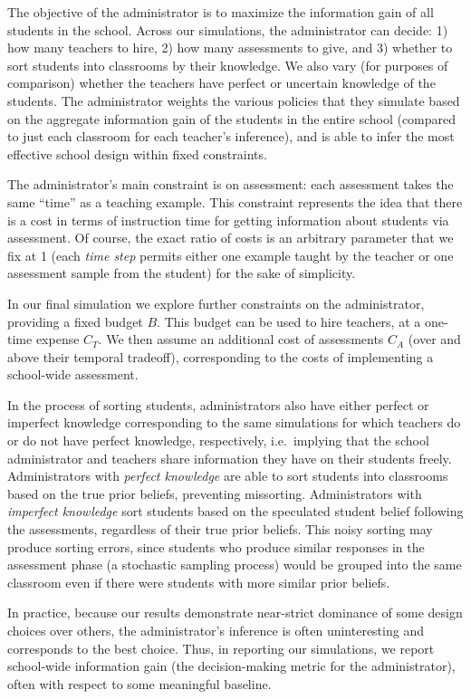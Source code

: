 \documentclass[10pt, letterpaper]{article}
\begin{document}
The objective of the administrator is to maximize the information gain
of all students in the school. Across our simulations, the administrator
can decide: 1) how many teachers to hire, 2) how many assessments to
give, and 3) whether to sort students into classrooms by their
knowledge. We also vary (for purposes of comparison) whether the
teachers have perfect or uncertain knowledge of the students. The
administrator weights the various policies that they simulate based on
the aggregate information gain of the students in the entire school
(compared to just each classroom for each teacher's inference), and is
able to infer the most effective school design within fixed constraints.

The administrator's main constraint is on assessment: each assessment
takes the same ``time'' as a teaching example. This constraint
represents the idea that there is a cost in terms of instruction time
for getting information about students via assessment. Of course, the
exact ratio of costs is an arbitrary parameter that we fix at 1 (each
\emph{time step} permits either one example taught by the teacher or one
assessment sample from the student) for the sake of simplicity.

In our final simulation we explore further constraints on the
administrator, providing a fixed budget \(B\). This budget can be used
to hire teachers, at a one-time expense \(C_T\). We then assume an
additional cost of assessments \(C_A\) (over and above their temporal
tradeoff), corresponding to the costs of implementing a school-wide
assessment.

In the process of sorting students, administrators also have either
perfect or imperfect knowledge corresponding to the same simulations for
which teachers do or do not have perfect knowledge, respectively,
i.e.~implying that the school administrator and teachers share
information they have on their students freely. Administrators with
\emph{perfect knowledge} are able to sort students into classrooms based
on the true prior beliefs, preventing missorting. Administrators with
\emph{imperfect knowledge} sort students based on the speculated student
belief following the assessments, regardless of their true prior
beliefs. This noisy sorting may produce sorting errors, since students
who produce similar responses in the assessment phase (a stochastic
sampling process) would be grouped into the same classroom even if there
were students with more similar prior beliefs.

In practice, because our results demonstrate near-strict dominance of
some design choices over others, the administrator's inference is often
uninteresting and corresponds to the best choice. Thus, in reporting our
simulations, we report school-wide information gain (the decision-making
metric for the administrator), often with respect to some meaningful
baseline.
\end{document}
